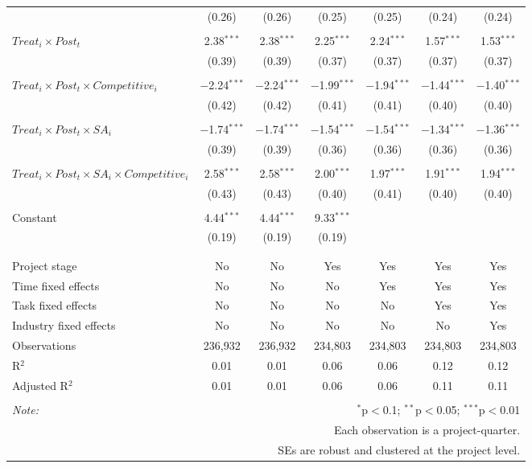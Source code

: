 \documentclass[
]{article}
\begin{document}
\begin{table}[H]
\begin{tabular}{@{\extracolsep{-3pt}}lcccccc}
  & (0.26) & (0.26) & (0.25) & (0.25) & (0.24) & (0.24) \\ 
  & & & & & & \\ 
 $Treat_i \times Post_t$ & 2.38$^{***}$ & 2.38$^{***}$ & 2.25$^{***}$ & 2.24$^{***}$ & 1.57$^{***}$ & 1.53$^{***}$ \\ 
  & (0.39) & (0.39) & (0.37) & (0.37) & (0.37) & (0.37) \\ 
  & & & & & & \\ 
 $Treat_i \times Post_t \times Competitive_i$ & $-$2.24$^{***}$ & $-$2.24$^{***}$ & $-$1.99$^{***}$ & $-$1.94$^{***}$ & $-$1.44$^{***}$ & $-$1.40$^{***}$ \\ 
  & (0.42) & (0.42) & (0.41) & (0.41) & (0.40) & (0.40) \\ 
  & & & & & & \\ 
 $Treat_i \times Post_t \times SA_i$ & $-$1.74$^{***}$ & $-$1.74$^{***}$ & $-$1.54$^{***}$ & $-$1.54$^{***}$ & $-$1.34$^{***}$ & $-$1.36$^{***}$ \\ 
  & (0.39) & (0.39) & (0.36) & (0.36) & (0.36) & (0.36) \\ 
  & & & & & & \\ 
 $Treat_i \times Post_t \times SA_i \times Competitive_i$ & 2.58$^{***}$ & 2.58$^{***}$ & 2.00$^{***}$ & 1.97$^{***}$ & 1.91$^{***}$ & 1.94$^{***}$ \\ 
  & (0.43) & (0.43) & (0.40) & (0.41) & (0.40) & (0.40) \\ 
  & & & & & & \\ 
 Constant & 4.44$^{***}$ & 4.44$^{***}$ & 9.33$^{***}$ &  &  &  \\ 
  & (0.19) & (0.19) & (0.19) &  &  &  \\ 
  & & & & & & \\ 
\hline \\[-1.8ex] 
Project stage & No & No & Yes & Yes & Yes & Yes \\ 
Time fixed effects & No & No & No & Yes & Yes & Yes \\ 
Task fixed effects & No & No & No & No & Yes & Yes \\ 
Industry fixed effects & No & No & No & No & No & Yes \\ 
Observations & 236,932 & 236,932 & 234,803 & 234,803 & 234,803 & 234,803 \\ 
R$^{2}$ & 0.01 & 0.01 & 0.06 & 0.06 & 0.12 & 0.12 \\ 
Adjusted R$^{2}$ & 0.01 & 0.01 & 0.06 & 0.06 & 0.11 & 0.11 \\ 
\hline 
\hline \\[-1.8ex] 
\textit{Note:}  & \multicolumn{6}{r}{$^{*}$p$<$0.1; $^{**}$p$<$0.05; $^{***}$p$<$0.01} \\ 
 & \multicolumn{6}{r}{Each observation is a project-quarter.} \\ 
 & \multicolumn{6}{r}{SEs are robust and clustered at the project level.} \\ 
\end{tabular} 
\end{table}
\end{document}
